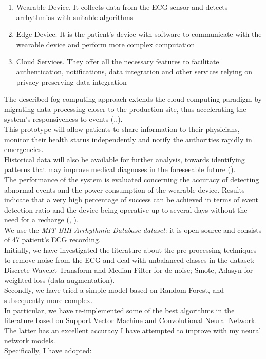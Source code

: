 \documentclass[LaM,binding=0.6cm]{sapthesis}
\begin{document}
\begin{enumerate}
\item Wearable Device. It collects data from the ECG sensor and detects arrhythmias with suitable algorithms
\item Edge Device. It is the patient's device with software to communicate with the wearable device and perform more complex computation
\item Cloud Services. They offer all the necessary features to facilitate authentication, notifications, data integration and other services relying on privacy-preserving data integration
\end{enumerate}
The described fog computing approach extends the cloud computing paradigm by migrating data-processing closer to the production site, thus accelerating the system's responsiveness to events (\cite{ufcf},\cite{ufcf2},\cite{fog}).\\This prototype will allow patients to share information to their physicians, monitor their health status independently and notify the authorities rapidly in emergencies.\\Historical data will also be available for further analysis, towards identifying patterns that may improve medical diagnoses in the foreseeable future (\cite{otdo}).\\The performance of the system is evaluated concerning the accuracy of detecting abnormal events and the power consumption of the wearable device. Results indicate that a very high percentage of success can be achieved in terms of event detection ratio and the device being operative up to several days without the need for a recharge (\cite{potf}, \cite{aoat}).\\We use the \textit{MIT-BIH Arrhythmia Database dataset}: it is open source and consists of 47 patient's ECG recording.\\Initially, we have investigated the literature about the pre-processing techniques to remove noise from the ECG and deal with unbalanced classes in the dataset: Discrete Wavelet Transform and Median Filter for de-noise; Smote, Adasyn for weighted loss (data augmentation).\\Secondly, we have tried a simple model based on Random Forest, and subsequently more complex.\\In particular, we have re-implemented some of the best algorithms in the literature based on Support Vector Machine and Convolutional Neural Network. The latter has an excellent accuracy I have attempted to improve with my neural network models.\\Specifically, I have adopted:
\end{document}
